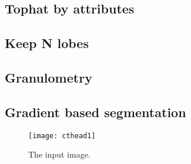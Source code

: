 \documentclass{InsightArticle}
\begin{document}
  \subsection{Tophat by attributes}

  \subsection{Keep N lobes}

  \subsection{Granulometry}

  \subsection{Gradient based segmentation}







\begin{figure}[htbp]
\centering
\texttt{[image: cthead1]}
\caption{The input image.\label{cthead1}}
\end{figure}


\appendix





\nocite{ITKSoftwareGuide}
\end{document}
